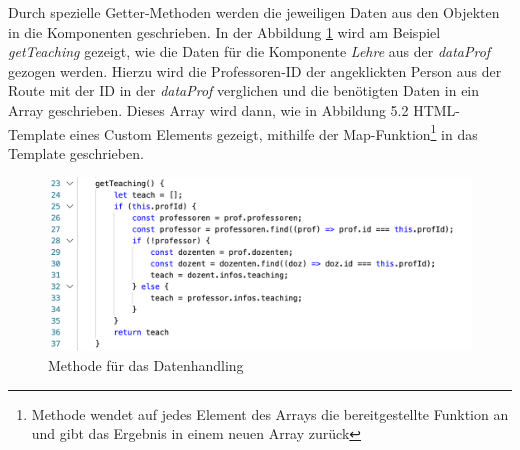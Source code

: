 \documentclass[12pt,					%
							 oneside,			%
							 a4paper,			%
							 halfparskip,		%
							 liststotoc,			%
							 bibtotoc,			%
							 fleqn,				%
							 pointlessnumbers]	%
							 {scrreprt}
\begin{document}
	Durch spezielle Getter-Methoden werden die jeweiligen Daten aus den Objekten in die Komponenten geschrieben. In der Abbildung \ref{getTeaching} wird am Beispiel \textit{getTeaching} gezeigt, wie die Daten für die Komponente \textit{Lehre} aus der \textit{dataProf} gezogen werden. Hierzu wird die Professoren-ID der angeklickten Person aus der Route mit der ID in der \textit{dataProf} verglichen und die benötigten Daten in ein Array geschrieben. Dieses Array wird dann, wie in Abbildung 5.2 HTML-Template eines Custom Elements gezeigt, mithilfe der Map-Funktion\footnote{\label{foot:1}Methode wendet auf jedes Element des Arrays die bereitgestellte Funktion an und gibt das Ergebnis in einem neuen Array zurück} in das Template geschrieben.
	\begin{figure}[h]
		\centering
		\includegraphics[width=1\textwidth]{pictures/getTeaching.png}
		\caption{Methode für das Datenhandling}						
		\label{getTeaching}
	\end{figure}
\newpage	
\end{document}
